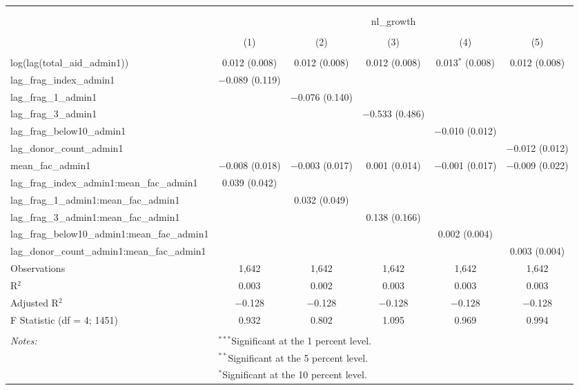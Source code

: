 
\begin{table}[!htbp] \centering 
  \caption{} 
  \label{} 
\begin{tabular}{@{\extracolsep{2pt}}lccccc} 
\\[-1.8ex]\hline 
\hline \\[-1.8ex] 
\\[-1.8ex] & \multicolumn{5}{c}{nl\_growth} \\ 
\\[-1.8ex] & (1) & (2) & (3) & (4) & (5)\\ 
\hline \\[-1.8ex] 
 log(lag(total\_aid\_admin1)) & 0.012 (0.008) & 0.012 (0.008) & 0.012 (0.008) & 0.013$^{*}$ (0.008) & 0.012 (0.008) \\ 
  lag\_frag\_index\_admin1 & $-$0.089 (0.119) &  &  &  &  \\ 
  lag\_frag\_1\_admin1 &  & $-$0.076 (0.140) &  &  &  \\ 
  lag\_frag\_3\_admin1 &  &  & $-$0.533 (0.486) &  &  \\ 
  lag\_frag\_below10\_admin1 &  &  &  & $-$0.010 (0.012) &  \\ 
  lag\_donor\_count\_admin1 &  &  &  &  & $-$0.012 (0.012) \\ 
  mean\_fac\_admin1 & $-$0.008 (0.018) & $-$0.003 (0.017) & 0.001 (0.014) & $-$0.001 (0.017) & $-$0.009 (0.022) \\ 
  lag\_frag\_index\_admin1:mean\_fac\_admin1 & 0.039 (0.042) &  &  &  &  \\ 
  lag\_frag\_1\_admin1:mean\_fac\_admin1 &  & 0.032 (0.049) &  &  &  \\ 
  lag\_frag\_3\_admin1:mean\_fac\_admin1 &  &  & 0.138 (0.166) &  &  \\ 
  lag\_frag\_below10\_admin1:mean\_fac\_admin1 &  &  &  & 0.002 (0.004) &  \\ 
  lag\_donor\_count\_admin1:mean\_fac\_admin1 &  &  &  &  & 0.003 (0.004) \\ 
 Observations & 1,642 & 1,642 & 1,642 & 1,642 & 1,642 \\ 
R$^{2}$ & 0.003 & 0.002 & 0.003 & 0.003 & 0.003 \\ 
Adjusted R$^{2}$ & $-$0.128 & $-$0.128 & $-$0.128 & $-$0.128 & $-$0.128 \\ 
F Statistic (df = 4; 1451) & 0.932 & 0.802 & 1.095 & 0.969 & 0.994 \\ 
\hline \\[-1.8ex] 
\textit{Notes:} & \multicolumn{5}{l}{$^{***}$Significant at the 1 percent level.} \\ 
 & \multicolumn{5}{l}{$^{**}$Significant at the 5 percent level.} \\ 
 & \multicolumn{5}{l}{$^{*}$Significant at the 10 percent level.} \\ 
\end{tabular} 
\end{table} 
